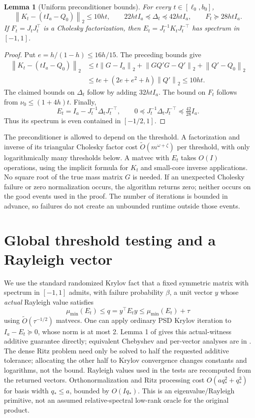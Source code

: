 \documentclass[11pt]{article}
\newtheorem{lemma}[theorem]{Lemma}
\newcommand{\norm}[1]{\left\lVert#1\right\rVert}
\newcommand{\tO}{\widetilde O}
\begin{document}
\begin{lemma}[Uniform preconditioner bounds]\label{lem:precond}
For every \(t\in[\ell_0,b_0]\),
\[
 \norm{K_t-(tI_a-Q_0)}_2\leq10ht,\qquad
 22htI_a\preceq\Delta_t\preceq42htI_a,\qquad
 F_t\succeq28htI_a.
\]
If \(F_t=J_tJ_t^\top\) is a Cholesky factorization, then
\(E_t=J_t^{-1}K_tJ_t^{-\top}\) has spectrum in \([-1,1]\).
\end{lemma}
\begin{proof}
Put \(e=h/(1-h)\leq16h/15\). The preceding bounds give
\begin{align*}
 \norm{K_t-(tI_a-Q_0)}_2
 &\leq t\norm{G-I_a}_2+
          \norm{GQ'G-Q'}_2+\norm{Q'-Q_0}_2\\
 &\leq te+(2e+e^2+h)\norm{Q'}_2\leq10ht.
\end{align*}
The claimed bounds on \(\Delta_t\) follow by adding \(32htI_a\).
The bound on \(F_t\) follows from \(\nu_0\leq(1+4h)t\).
Finally,
\[
 E_t=I_a-J_t^{-1}\Delta_tJ_t^{-\top},\qquad
 0\preceq J_t^{-1}\Delta_tJ_t^{-\top}\preceq\tfrac{42}{28}I_a.
\]
Thus its spectrum is even contained in \([-1/2,1]\).
\end{proof}

The preconditioner is allowed to depend on the threshold. A factorization
and inverse of its triangular Cholesky factor cost
\(\tO(m^{\omega+\zeta})\) per threshold, with only logarithmically
many thresholds below. A matvec with \(E_t\) takes \(O(I)\)
operations, using the implicit formula for \(K_t\) and small-core inverse
applications. No square root of the true mass matrix \(G\) is needed.
If an unexpected Cholesky failure or zero normalization occurs, the algorithm
returns zero; neither occurs on the good events used in the proof. The number
of iterations is bounded in advance, so failures do not create an unbounded
runtime outside those events.

\section{Global threshold testing and a Rayleigh vector}
We use the standard randomized Krylov fact that a fixed symmetric matrix
with spectrum in \([-1,1]\) admits, with failure probability \(\beta\),
a unit vector \(y\) whose \emph{actual} Rayleigh value satisfies
\begin{equation}\label{eq:ritz}
 \mu_{\min}(E_t)\leq q=y^\top E_ty\leq\mu_{\min}(E_t)+\tau
\end{equation}
using \(\tO(\tau^{-1/2})\) matvecs. One can apply ordinary PSD
Krylov iteration to \(I_a-E_t\succeq0\), whose norm is at most 2.
Lemma 1 of \cite{jyz} gives this actual-witness additive guarantee directly;
equivalent Chebyshev and per-vector analyses are in \cite{mm}.
The dense Ritz problem need only be solved to half the requested additive
tolerance; allocating the other half to Krylov convergence changes constants
and logarithms, not the bound. Rayleigh values used in the tests are recomputed
from the returned vectors.
Orthonormalization and Ritz processing
cost \(O(aq_*^2+q_*^3)\) for basis width \(q_*\leq a\), bounded by
\(O(Iq_*)\). This is an eigenvalue/Rayleigh primitive, not an assumed
relative-spectral low-rank oracle for the original product.
\end{document}

